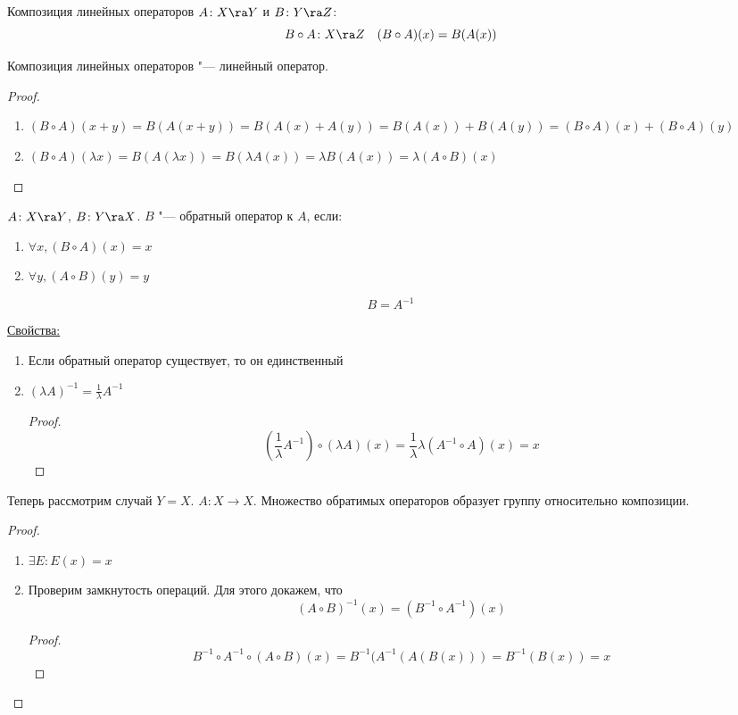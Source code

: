 \begin{Def}
	Композиция линейных операторов $A \colon X \ra Y$ и $B \colon Y \ra Z$:
	\[ B \circ A \colon X \ra Z \quad (B \circ A)(x) = B(A(x)) \]
\end{Def}
\begin{theorem}
	Композиция линейных операторов "--- линейный оператор.
\end{theorem}
\begin{proof}
	\begin{enumerate}
		\item $(B \circ A)(x + y)  = B(A(x + y)) = B(A(x) + A(y)) = B(A(x)) + B(A(y))  = (B \circ A)(x) + (B \circ A)(y)$
		\item $(B \circ A)(\lambda x) = B(A(\lambda x)) = B(\lambda A(x)) = \lambda B(A(x)) = \lambda (A \circ B) (x)$
	\end{enumerate}
\end{proof}

\begin{Def}
	$A \colon X \ra Y$, $B \colon Y \ra X$.
	$B$ "--- обратный оператор к $A$, если:
	\begin{enumerate}
		\item $\forall x, (B \circ A)(x) = x$
		\item $\forall y, (A \circ B)(y) = y$
	\end{enumerate}
	\[ B = A^{-1} \]
\end{Def}

\underline{Свойства:}
\begin{enumerate}
	\item Если обратный оператор существует, то он единственный
	\item $(\lambda A)^{-1} = \frac{1}{\lambda}A^{-1}$
	\begin{proof}
		\[ \left(\frac{1}{\lambda}A^{-1}\right) \circ \left(\lambda A\right)(x) = \frac{1}{\lambda} \lambda\left(A^{-1} \circ A\right)(x) = x \]
	\end{proof}
\end{enumerate}

\begin{theorem}
	Теперь рассмотрим случай $Y = X$. $A \colon X \to X$.
	Множество обратимых операторов образует группу относительно композиции.
\end{theorem}
\begin{proof}
	\begin{enumerate}
	\item
		$\exists E \colon E(x) = x$
	\item
		Проверим замкнутость операций. Для этого докажем, что
		\[ (A \circ B) ^ {-1} (x) = (B^{-1} \circ A^{-1}) (x) \]
		\begin{proof}
			\[ B^{-1} \circ A^{-1} \circ (A \circ B) (x) = B^{-1}(A^{-1}(A(B(x))) = B^{-1}(B(x)) = x \]
		\end{proof}
	\end{enumerate}
\end{proof}

